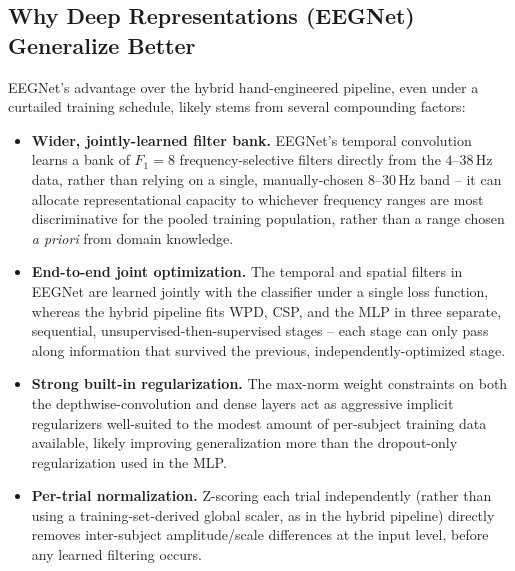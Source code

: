 \documentclass[11pt,a4paper]{article}
\begin{document}
\subsection{Why Deep Representations (EEGNet) Generalize Better}
EEGNet's advantage over the hybrid hand-engineered pipeline, even under a curtailed training schedule,
likely stems from several compounding factors:
\begin{itemize}[leftmargin=1.2cm]
    \item \textbf{Wider, jointly-learned filter bank.} EEGNet's temporal convolution learns a bank of
    $F_1=8$ frequency-selective filters directly from the $4$--$38$\,Hz data, rather than relying on a
    single, manually-chosen $8$--$30$\,Hz band -- it can allocate representational capacity to
    whichever frequency ranges are most discriminative for the pooled training population, rather than
    a range chosen \emph{a priori} from domain knowledge.
    \item \textbf{End-to-end joint optimization.} The temporal and spatial filters in EEGNet are
    learned jointly with the classifier under a single loss function, whereas the hybrid pipeline
    fits WPD, CSP, and the MLP in three separate, sequential, unsupervised-then-supervised stages --
    each stage can only pass along information that survived the previous, independently-optimized
    stage.
    \item \textbf{Strong built-in regularization.} The max-norm weight constraints on both the
    depthwise-convolution and dense layers act as aggressive implicit regularizers well-suited to the
    modest amount of per-subject training data available, likely improving generalization more than
    the dropout-only regularization used in the MLP.
    \item \textbf{Per-trial normalization.} Z-scoring each trial independently (rather than using a
    training-set-derived global scaler, as in the hybrid pipeline) directly removes inter-subject
    amplitude/scale differences at the input level, before any learned filtering occurs.
\end{itemize}
\end{document}
